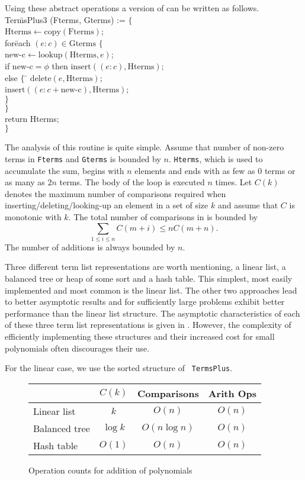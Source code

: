 Using these abstract operations a version of  can be
written as follows. 
\begindsacode
Ter\=msPlus3 (Fterms, Gterms) := $\{$ \\
\> $\mbox{Hterms} \leftarrow \mbox{copy}(\mbox{Fterms})$; \\
\> for\=each $(e : c) \in \mbox{Gterms}$ $\{$ \\
\>\> $\mbox{new-c} \leftarrow \mbox{lookup}(\mbox{Hterms}, e)$; \\
\>\> if $\mbox{new-c} = \phi$ then $\mbox{insert}((e : c), \mbox{Hterms})$;\\
\>\> else $\{$ \= $\mbox{delete}(e, \mbox{Hterms})$;\\
\>\>\> $\mbox{insert}((e : c + \mbox{new-c}), \mbox{Hterms})$; \\
\>\>\> $\}$\\
\>\> $\}$ \\
\> return Hterms; \\
\> $\}$
\enddsacode

The analysis of this routine is quite simple.  Assume that number of
non-zero terms in {\tt Fterms} and {\tt Gterms} is bounded by $n$.
{\tt Hterms}, which is used to accumulate the sum, begins with $n$
elements and ends with as few as $0$ terms or as many as $2n$ terms.
The body of the  loop is executed $n$ times.  Let $C(k)$
denotes the maximum number of comparisons required when
inserting/deleting/looking-up an element in a set of size $k$ and
assume that $C$ is monotonic with $k$.  The total number of
comparisons in  is bounded by
\[
\sum_{1 \le i \le n} C(m+i) \le n C(m+n).
\]
The number of additions is always bounded by $n$.  

Three different term list representations are worth mentioning, a
linear list, a balanced tree or heap of some sort and a hash table.
This simplest, most easily implemented and most common is the linear
list.  The other two approaches lead to better asymptotic results and
for sufficiently large problems exhibit better performance than the
linear list structure.  The asymptotic characteristics of each of
these three term list representations is given in
.  However, the complexity of efficiently
implementing these structures and their increased cost for small
polynomials often discourages their use.

For the linear case, we use the sorted structure of {\tt
TermsPlus}.  
\begin{figure}
\begin{center}
\begin{tabular}{|l|c|c|c|} 
\multicolumn{1}{l}{}& \multicolumn{1}{c}{$C(k)$} & 
  \multicolumn{1}{c}{Comparisons} & \multicolumn{1}{c}{Arith Ops} \\ \hline
Linear list & $k$ & $O(n)$ & $O(n)$ \\ \hline
Balanced tree & $\log k$ & $O(n \log n)$ & $O(n)$ \\ \hline
Hash table & $O(1)$ & $O(n)$ & $O(n)$ \\ \hline
\end{tabular} 
\end{center}
\caption{Operation counts for addition of
polynomials\label{OperationCount:Add:Fig}} 
\end{figure}

